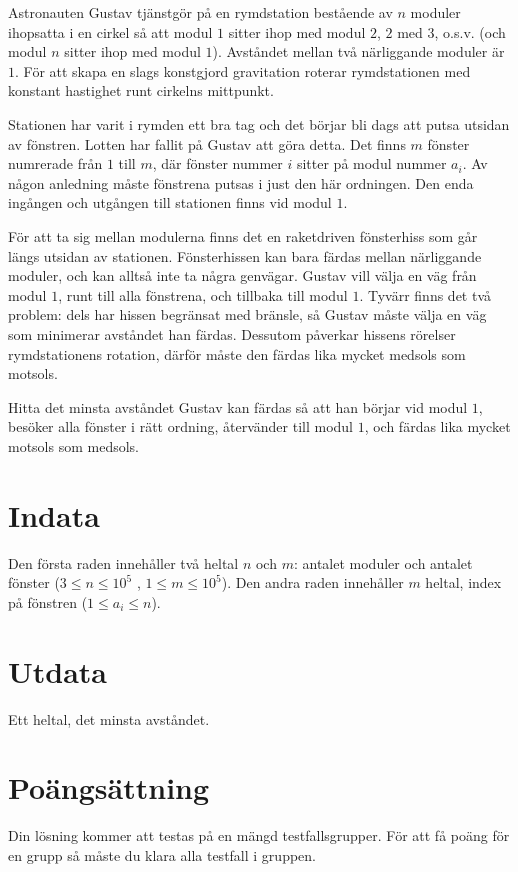 Astronauten Gustav tjänstgör på en rymdstation bestående av $n$ moduler ihopsatta i en cirkel så att modul $1$ sitter ihop med modul $2$, $2$ med $3$, o.s.v. (och modul $n$ sitter ihop med modul $1$).
Avståndet mellan två närliggande moduler är $1$. För att skapa en slags konstgjord gravitation roterar rymdstationen med konstant hastighet runt cirkelns mittpunkt.

Stationen har varit i rymden ett bra tag och det börjar bli dags att putsa utsidan av fönstren. 
Lotten har fallit på Gustav att göra detta. Det finns $m$ fönster numrerade från $1$ till $m$, där fönster nummer $i$ sitter på modul nummer $a_i$. 
Av någon anledning måste fönstrena putsas i just den här ordningen. Den enda ingången och utgången till stationen finns vid modul $1$.

För att ta sig mellan modulerna finns det en raketdriven fönsterhiss som går längs utsidan av stationen.
Fönsterhissen kan bara färdas mellan närliggande moduler, och kan alltså inte ta några genvägar.
Gustav vill välja en väg från modul $1$, runt till alla fönstrena, och tillbaka till modul $1$. 
Tyvärr finns det två problem: dels har hissen begränsat med bränsle, så Gustav måste välja en väg som minimerar avståndet han färdas. 
Dessutom påverkar hissens rörelser rymdstationens rotation, därför måste den färdas lika mycket medsols som motsols.

Hitta det minsta avståndet Gustav kan färdas så att han börjar vid modul $1$, besöker alla fönster i rätt ordning, återvänder till modul $1$, och färdas lika mycket motsols som medsols.

\section*{Indata}
Den första raden innehåller två heltal $n$ och $m$: antalet moduler och antalet fönster ($3 \leq n \leq 10^5$ , $1 \leq m \leq 10^5$).
Den andra raden innehåller $m$ heltal, index på fönstren ($1 \leq a_i \leq n$).
\section*{Utdata}
Ett heltal, det minsta avståndet.
\section*{Poängsättning}
Din lösning kommer att testas på en mängd testfallsgrupper. För att få poäng för en grupp så måste du klara alla testfall i gruppen.


